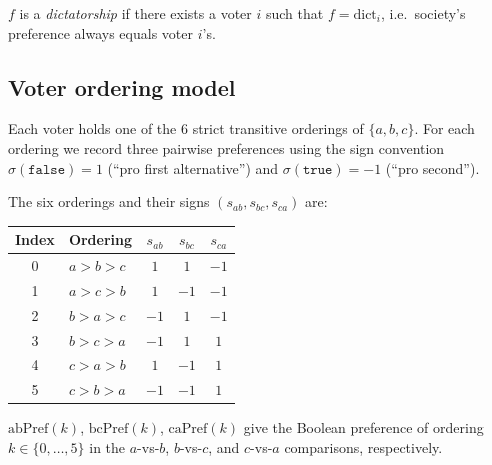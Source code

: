 \begin{definition}[Dictatorship]
\label{ArrowTheorem.isDictator}
\leanok
{}
$f$ is a \emph{dictatorship} if there exists a voter $i$ such that
$f = \mathrm{dict}_i$, i.e.\ society's preference always equals voter $i$'s.
\end{definition}

\subsection{Voter ordering model}

Each voter holds one of the 6 strict transitive orderings of $\{a,b,c\}$.
For each ordering we record three pairwise preferences using the sign
convention $\sigma(\texttt{false}) = 1$ (``pro first alternative'') and
$\sigma(\texttt{true}) = -1$ (``pro second'').

The six orderings and their signs $(s_{ab}, s_{bc}, s_{ca})$ are:
\begin{center}
\begin{tabular}{clccc}
Index & Ordering & $s_{ab}$ & $s_{bc}$ & $s_{ca}$ \\\hline
0 & $a>b>c$ & $1$ & $1$ & $-1$ \\
1 & $a>c>b$ & $1$ & $-1$ & $-1$ \\
2 & $b>a>c$ & $-1$ & $1$ & $-1$ \\
3 & $b>c>a$ & $-1$ & $1$ & $1$ \\
4 & $c>a>b$ & $1$ & $-1$ & $1$ \\
5 & $c>b>a$ & $-1$ & $-1$ & $1$ \\
\end{tabular}
\end{center}

\begin{definition}
\label{ArrowTheorem.abPref}
\label{ArrowTheorem.bcPref}
\label{ArrowTheorem.caPref}
\leanok
$\mathrm{abPref}(k)$, $\mathrm{bcPref}(k)$, $\mathrm{caPref}(k)$ give the
Boolean preference of ordering $k\in\{0,\dots,5\}$ in the $a$-vs-$b$,
$b$-vs-$c$, and $c$-vs-$a$ comparisons, respectively.
\end{definition}

